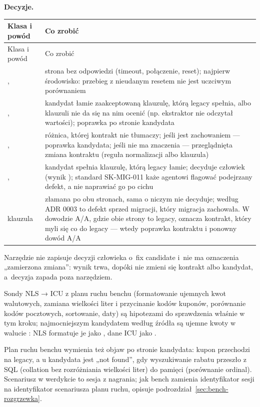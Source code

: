 \textbf{Decyzje.}
\begin{xltabular}{\linewidth}{@{}>{\raggedright\arraybackslash}p{4.8cm} >{\raggedright\arraybackslash}X@{}}
\toprule
Klasa i powód & Co zrobić \\
\midrule
\endfirsthead
\toprule
Klasa i powód & Co zrobić \\
\midrule
\endhead
{},  & strona bez odpowiedzi (timeout, połączenie, reset); najpierw środowisko: przebieg z nieudanym resetem nie jest uczciwym porównaniem \\
,  & kandydat łamie zaakceptowaną klauzulę, którą legacy spełnia, albo klauzuli nie da się na nim ocenić (np. ekstraktor nie odczytał wartości); poprawka po stronie kandydata \\
,  & różnica, której kontrakt nie tłumaczy; jeśli jest zachowaniem --- poprawka kandydata; jeśli nie ma znaczenia --- przeglądnięta zmiana kontraktu (reguła normalizacji albo klauzula) \\
,  & kandydat spełnia klauzulę, którą legacy łamie; decyduje człowiek (wynik ); standard SK-MIG-011 każe agentowi flagować podejrzany defekt, a nie naprawiać go po cichu \\
klauzula  & złamana po obu stronach, sama o niczym nie decyduje; według ADR 0003 to defekt sprzed migracji, który migracja zachowała. W dowodzie A/A, gdzie obie strony to legacy, oznacza kontrakt, który myli się co do legacy --- wtedy poprawka kontraktu i ponowny dowód A/A \\
\bottomrule
\end{xltabular}

Narzędzie nie zapisuje decyzji człowieka o~fix candidate i~nie ma oznaczenia „zamierzona
zmiana”: wynik  trwa, dopóki nie zmieni się kontrakt albo kandydat, a~decyzja
zapada poza narzędziem.

Sondy NLS → ICU z planu ruchu benchu (formatowanie ujemnych kwot walutowych, zamiana
wielkości liter i przycinanie kodów kuponów, porównanie kodów pocztowych, sortowanie,
daty) są hipotezami do sprawdzenia właśnie w tym kroku; najmocniejszym kandydatem według
źródła są ujemne kwoty w walucie : NLS formatuje je jako
, dane ICU jako .

Plan ruchu benchu wymienia też objaw po stronie kandydata: kupon przechodzi na legacy, a u
kandydata jest „not found”, gdy wyszukiwanie rabatu przeszło z SQL (collation bez
rozróżniania wielkości liter) do pamięci (porównanie ordinal). Scenariusz w werdykcie to
sesja z nagrania; jak bench zamienia identyfikator sesji na identyfikator scenariusza planu
ruchu, opisuje podrozdział~\ref{sec:bench-rozgrzewka}.

